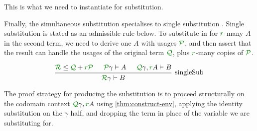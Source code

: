 
This is what we need to instantiate  for substitution.


Finally, the simultaneous substitution  specialises to
single substitution .
Single substitution is stated as an admissible rule below.
To substitute in for $\gr r$-many $A$ in the second term, we need to derive
one $A$ with usages $\grP$, and then assert that the result can handle the
usages of the original term $\grQ$, plus $\gr r$-many copies of $\grP$.

\[
  \begin{prooftree}
    \hypo{\grR \leq \grQ + \gr r\grP}
    \hypo{\grP\gamma \vdash A}
    \hypo{\grQ\gamma, \gr rA \vdash B}
    \infer3[singleSub]{\grR\gamma \vdash B}
  \end{prooftree}
\]

The proof strategy for producing the substitution \AgdaFunction{$\sigma$} is
to proceed structurally on the codomain context $\grQ\gamma, \gr rA$ using
\cref{thm:construct-env}, applying the identity substitution
 on the $\gamma$ half, and dropping the term
 in place of the variable we are substituting for.

